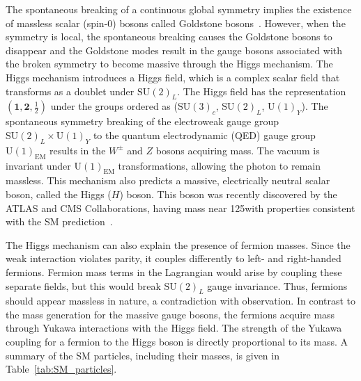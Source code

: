 The spontaneous breaking of a continuous global symmetry implies the existence of massless scalar (spin-0) bosons called Goldstone bosons~\cite{Nambu:1960tm,Goldstone:1961eq,Goldstone:1962es}. However, when the symmetry is local, the spontaneous breaking causes the Goldstone bosons to disappear and the Goldstone modes result in the gauge bosons associated with the broken symmetry to become massive through the Higgs mechanism. The Higgs mechanism introduces a Higgs field, which is a complex scalar field that transforms as a doublet under $\mathrm{SU}(2)_L$. The Higgs field has the representation $(\mathbf{1},\mathbf{2},\frac{1}{2})$ under the groups ordered as ($\mathrm{SU}(3)_c$, $\mathrm{SU}(2)_L$, $\mathrm{U}(1)_Y$). The spontaneous symmetry breaking of the electroweak gauge group $\mathrm{SU}(2)_L \times \mathrm{U}(1)_Y$ to the quantum electrodynamic (QED) gauge group $\mathrm{U}(1)_{\mathrm{EM}}$ results in the $W^{\pm}$ and $Z$ bosons acquiring mass. The vacuum is invariant under $\mathrm{U}(1)_{\mathrm{EM}}$ transformations, allowing the photon to remain massless. This mechanism also predicts a massive, electrically neutral scalar boson, called the Higgs ($H$) boson. This boson was recently discovered by the ATLAS and CMS Collaborations, having mass near 125\GeV with properties consistent with the SM prediction~\cite{Aad:2012tfa,Chatrchyan:2012xdj,Aad:2015zhl,Khachatryan:2016vau,Sirunyan:2018koj}.

The Higgs mechanism can also explain the presence of fermion masses. Since the weak interaction violates parity, it couples differently to left- and right-handed fermions. Fermion mass terms in the Lagrangian would arise by coupling these separate fields, but this would break $\mathrm{SU}(2)_L$ gauge invariance. Thus, fermions should appear massless in nature, a contradiction with observation. In contrast to the mass generation for the massive gauge bosons, the fermions acquire mass through Yukawa interactions with the Higgs field. The strength of the Yukawa coupling for a fermion to the Higgs boson is directly proportional to its mass.  A summary of the SM particles, including their masses, is given in Table~\ref{tab:SM_particles}.

